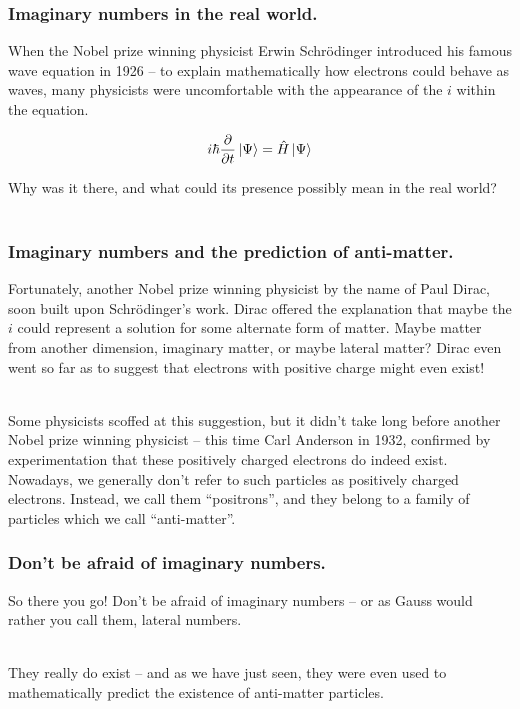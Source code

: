 \begin{frame}
\frametitle{Imaginary numbers in the real world.}

When the Nobel prize winning physicist Erwin Schr\"odinger introduced his famous wave equation in 1926 -- to explain mathematically how electrons
could behave as waves, many physicists were uncomfortable with the appearance of the \(i\) within the equation.

\begin{equation}
  i\hbar\dfrac{\partial}{\partial t}\ket{\Psi} = \hat{H}\ket{\Psi}
\end{equation}

 Why was it there, and what could its presence possibly mean in the real world?\\~\

\end{frame}


%
%

\begin{frame}
\frametitle{Imaginary numbers and the prediction of anti-matter.}

Fortunately, another Nobel prize winning physicist by the name of Paul Dirac, soon built upon Schr\"odinger's work. Dirac offered the explanation that maybe the
\(i\) could represent a solution for some alternate form of matter. Maybe matter from another dimension, imaginary matter, or maybe 
lateral matter? Dirac even went so far as to suggest that electrons with positive charge might even exist!\\~\

Some physicists scoffed at this suggestion, but it didn't take long before another Nobel prize winning physicist -- this time Carl Anderson in 1932, confirmed
by experimentation that these positively charged electrons do indeed exist. Nowadays, we generally don't refer to such particles as positively charged electrons.
Instead, we call them ``positrons'', and they belong to a family of particles which we call ``anti-matter''.

\end{frame}


%
%

\begin{frame}
\frametitle{Don't be afraid of imaginary numbers.}

So there you go! Don't be afraid of imaginary numbers -- or as Gauss would rather you call them, lateral numbers.\\~\

They really do exist -- and as we have just seen, they were even used to mathematically predict the existence of anti-matter particles.\\~\

\end{frame}


